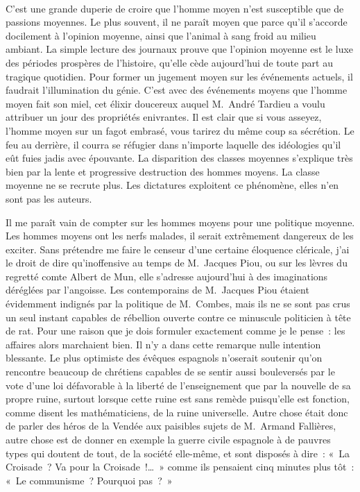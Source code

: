 \documentclass[french,twoside]{book} %
\begin{document}
\noindent  \par
C’est une grande duperie de croire que l’homme moyen n’est susceptible que de passions moyennes. Le plus souvent, il ne paraît moyen que parce qu’il s’accorde docilement à l’opinion moyenne, ainsi que l’animal à sang froid au milieu ambiant. La simple lecture des journaux prouve que l’opinion moyenne est le luxe des périodes prospères de l’histoire, qu’elle cède aujourd’hui de toute part au tragique quotidien. Pour former un jugement moyen sur les événements actuels, il faudrait l’illumination du génie. C’est avec des événements moyens que l’homme moyen fait son miel, cet élixir doucereux auquel M. André Tardieu a voulu attribuer un jour des propriétés enivrantes. Il est clair que si vous asseyez, l’homme moyen sur un fagot embrasé, vous tarirez du même coup sa sécrétion. Le feu au derrière, il courra se réfugier dans n’importe laquelle des idéologies qu’il eût fuies jadis avec épouvante. La disparition des classes moyennes s’explique très bien par la lente et progressive destruction des hommes moyens. La classe moyenne ne se recrute plus. Les dictatures exploitent ce phénomène, elles n’en sont pas les auteurs.\par
Il me paraît vain de compter sur les hommes moyens pour une politique moyenne. Les hommes moyens ont les nerfs malades, il serait extrêmement dangereux de les exciter. Sans prétendre me faire le censeur d’une certaine éloquence cléricale, j’ai le droit de dire qu’inoffensive au temps de M. Jacques Piou, ou sur les lèvres du regretté comte Albert de Mun, elle s’adresse aujourd’hui à des imaginations déréglées par l’angoisse. Les contemporains de M. Jacques Piou étaient évidemment indignés par la politique de M. Combes, mais ils ne se sont pas crus un seul instant capables de rébellion ouverte contre ce minuscule politicien à tête de rat. Pour une raison que je dois formuler exactement comme je le pense : les affaires alors marchaient bien. Il n’y a dans cette remarque nulle intention blessante. Le plus optimiste des évêques espagnols n’oserait soutenir qu’on rencontre beaucoup de chrétiens capables de se sentir aussi bouleversés par le vote d’une loi défavorable à la liberté de l’enseignement que par la nouvelle de sa propre ruine, surtout lorsque cette ruine est sans remède puisqu’elle est fonction, comme disent les mathématiciens, de la ruine universelle. Autre chose était donc de parler des héros de la Vendée aux paisibles sujets de M. Armand Fallières, autre chose est de donner en exemple la guerre civile espagnole à de pauvres types qui doutent de tout, de la société elle-même, et sont disposés à dire : « La Croisade ? Va pour la Croisade !… » comme ils pensaient cinq minutes plus tôt : « Le communisme ? Pourquoi pas ? »\par
\end{document}
